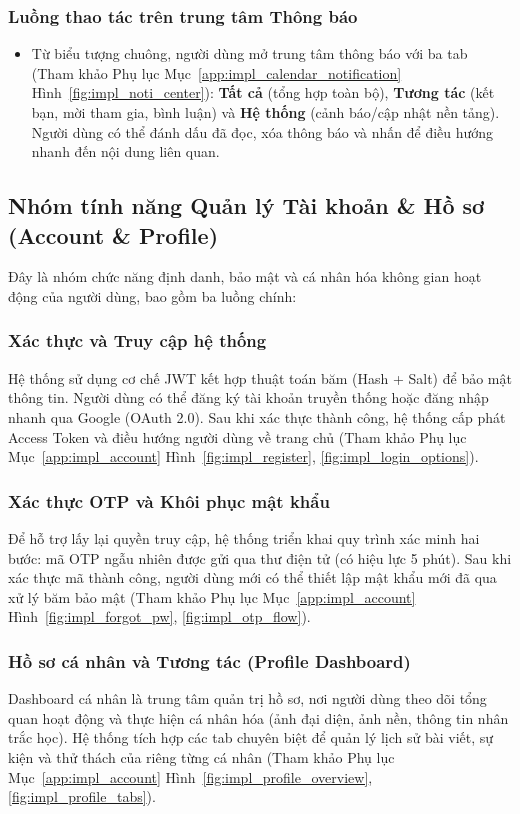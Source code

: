\subsubsection{Luồng thao tác trên trung tâm Thông báo}
\begin{itemize}
    \item Từ biểu tượng chuông, người dùng mở trung tâm thông báo với ba tab (Tham khảo Phụ lục Mục~\ref{app:impl_calendar_notification} Hình~\ref{fig:impl_noti_center}): \textbf{Tất cả} (tổng hợp toàn bộ), \textbf{Tương tác} (kết bạn, mời tham gia, bình luận) và \textbf{Hệ thống} (cảnh báo/cập nhật nền tảng). Người dùng có thể đánh dấu đã đọc, xóa thông báo và nhấn để điều hướng nhanh đến nội dung liên quan.

\end{itemize}

\subsection{Nhóm tính năng Quản lý Tài khoản \& Hồ sơ (Account \& Profile)}
\label{subsec:impl_account}

Đây là nhóm chức năng định danh, bảo mật và cá nhân hóa không gian hoạt động của người dùng, bao gồm ba luồng chính:

\subsubsection{Xác thực và Truy cập hệ thống}
Hệ thống sử dụng cơ chế JWT kết hợp thuật toán băm (Hash + Salt) để bảo mật thông tin. Người dùng có thể đăng ký tài khoản truyền thống hoặc đăng nhập nhanh qua Google (OAuth 2.0). Sau khi xác thực thành công, hệ thống cấp phát Access Token và điều hướng người dùng về trang chủ (Tham khảo Phụ lục Mục~\ref{app:impl_account} Hình~\ref{fig:impl_register}, \ref{fig:impl_login_options}).

\subsubsection{Xác thực OTP và Khôi phục mật khẩu}
Để hỗ trợ lấy lại quyền truy cập, hệ thống triển khai quy trình xác minh hai bước: mã OTP ngẫu nhiên được gửi qua thư điện tử (có hiệu lực 5 phút). Sau khi xác thực mã thành công, người dùng mới có thể thiết lập mật khẩu mới đã qua xử lý băm bảo mật (Tham khảo Phụ lục Mục~\ref{app:impl_account} Hình~\ref{fig:impl_forgot_pw}, \ref{fig:impl_otp_flow}).

\subsubsection{Hồ sơ cá nhân và Tương tác (Profile Dashboard)}
Dashboard cá nhân là trung tâm quản trị hồ sơ, nơi người dùng theo dõi tổng quan hoạt động và thực hiện cá nhân hóa (ảnh đại diện, ảnh nền, thông tin nhân trắc học). Hệ thống tích hợp các tab chuyên biệt để quản lý lịch sử bài viết, sự kiện và thử thách của riêng từng cá nhân (Tham khảo Phụ lục Mục~\ref{app:impl_account} Hình~\ref{fig:impl_profile_overview}, \ref{fig:impl_profile_tabs}).


